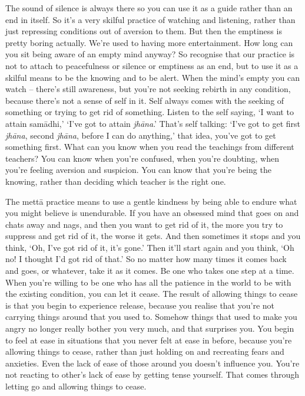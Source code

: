 The sound of silence is always there so you can use it as a guide rather than an end in itself. So it's a very skilful practice of watching and listening, rather than just repressing conditions out of aversion to them. But then the emptiness is pretty boring actually. We're used to having more entertainment. How long can you sit being aware of an empty mind anyway? So recognise that our practice is not to attach to peacefulness or silence or emptiness as an end, but to use it as a skilful means to be the knowing and to be alert. When the mind's empty you can watch -- there's still awareness, but you're not seeking rebirth in any condition, because there's not a sense of self in it. Self always comes with the seeking of something or trying to get rid of something. Listen to the self saying, `I want to attain samādhi,' `I've got to attain \textit{jhāna}.' That's self talking: `I've got to get first \textit{jhāna}, second \textit{jhāna}, before I can do anything,' that idea, you've got to get something first. What can you know when you read the teachings from different teachers? You can know when you're confused, when you're doubting, when you're feeling aversion and suspicion. You can know that you're being the knowing, rather than deciding which teacher is the right one.

The mettā practice means to use a gentle kindness by being able to endure what you might believe is unendurable. If you have an obsessed mind that goes on and chats away and nags, and then you want to get rid of it, the more you try to suppress and get rid of it, the worse it gets. And then sometimes it stops and you think, `Oh, I've got rid of it, it's gone.' Then it'll start again and you think, `Oh no! I thought I'd got rid of that.' So no matter how many times it comes back and goes, or whatever, take it as it comes. Be one who takes one step at a time. When you're willing to be one who has all the patience in the world to be with the existing condition, you can let it cease. The result of allowing things to cease is that you begin to experience release, because you realise that you're not carrying things around that you used to. Somehow things that used to make you angry no longer really bother you very much, and that surprises you. You begin to feel at ease in situations that you never felt at ease in before, because you're allowing things to cease, rather than just holding on and recreating fears and anxieties. Even the lack of ease of those around you doesn't influence you. You're not reacting to other's lack of ease by getting tense yourself. That comes through letting go and allowing things to cease.

